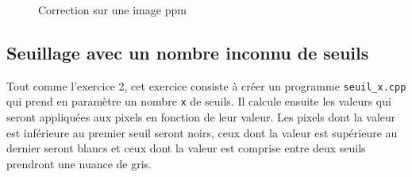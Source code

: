 \documentclass[11pt]{article}
\begin{document}
\begin{figure}[!htb]
  \centering
{}
\caption{Correction sur une image ppm}
\end{figure}

\FloatBarrier

\clearpage
\subsection{Seuillage avec un nombre inconnu de seuils}
Tout comme l'exercice 2, cet exercice consiste à créer un programme \texttt{seuil\_x.cpp}  qui prend en paramètre un nombre \texttt{x} de seuils. Il calcule ensuite les valeurs qui seront appliquées aux pixels en fonction de leur valeur. Les pixels dont la valeur est inférieure au premier seuil seront noirs, ceux dont la valeur est supérieure au dernier seront blancs et ceux dont la valeur est comprise entre deux seuils prendront une nuance de gris.
\end{document}
